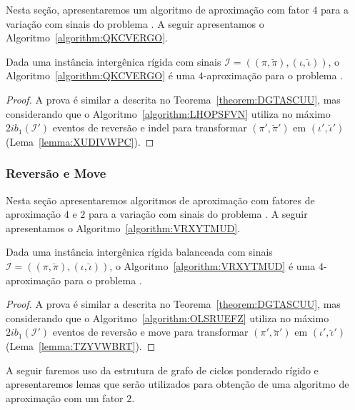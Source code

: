 Nesta seção, apresentaremos um algoritmo de aproximação com fator $4$ para a variação com sinais do problema \SbIRI{}. A seguir apresentamos o Algoritmo~\ref{algorithm:QKCVERGO}.



\begin{theorem}\label{theorem:CLXFCZMR}
Dada uma instância intergênica rígida com sinais $\mathcal{I}=((\pi,\breve\pi),(\iota,\breve\iota))$, o Algoritmo~\ref{algorithm:QKCVERGO} é uma $4$-aproximação para o problema \SbIRI{}.
\end{theorem}
\begin{proof}
A prova é similar a descrita no Teorema~\ref{theorem:DGTASCUU}, mas considerando que o Algoritmo~\ref{algorithm:LHOPSFVN} utiliza no máximo $2ib_1(\mathcal{I'})$ eventos de reversão e indel para transformar $(\pi',\breve\pi')$ em $(\iota',\breve\iota')$ (Lema~\ref{lemma:XUDIVWPC}).
\end{proof}

\subsubsection{Reversão e Move}

Nesta seção apresentaremos algoritmos de aproximação com fatores de aproximação $4$ e $2$ para a variação com sinais do problema \SbIRM{}. A seguir apresentamos o Algoritmo~\ref{algorithm:VRXYTMUD}.



\begin{theorem}\label{theorem:KJSCUFTB}
Dada uma instância intergênica rígida balanceada com sinais $\mathcal{I}=((\pi,\breve\pi),(\iota,\breve\iota))$, o Algoritmo~\ref{algorithm:VRXYTMUD} é uma $4$-aproximação para o problema \SbIRM{}.
\end{theorem}
\begin{proof}
A prova é similar a descrita no Teorema~\ref{theorem:DGTASCUU}, mas considerando que o Algoritmo~\ref{algorithm:OLSRUEFZ} utiliza no máximo $2ib_1(\mathcal{I'})$ eventos de reversão e move para transformar $(\pi',\breve\pi')$ em $(\iota',\breve\iota')$ (Lema~\ref{lemma:TZYVWBRT}).
\end{proof}

A seguir faremos uso da estrutura de grafo de ciclos ponderado rígido e apresentaremos lemas que serão utilizados para obtenção de uma algoritmo de aproximação com um fator $2$.

